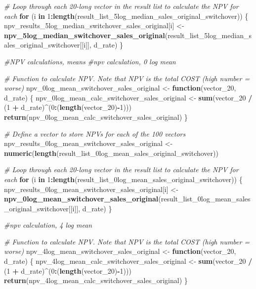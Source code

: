 \documentclass[
]{article}
\newenvironment{Shaded}{\begin{snugshade}}{\end{snugshade}}
\newcommand{\CommentTok}[1]{\textcolor[rgb]{0.56,0.35,0.01}{\textit{#1}}}
\newcommand{\ControlFlowTok}[1]{\textcolor[rgb]{0.13,0.29,0.53}{\textbf{#1}}}
\newcommand{\DecValTok}[1]{\textcolor[rgb]{0.00,0.00,0.81}{#1}}
\newcommand{\FunctionTok}[1]{\textcolor[rgb]{0.13,0.29,0.53}{\textbf{#1}}}
\newcommand{\NormalTok}[1]{#1}
\newcommand{\OtherTok}[1]{\textcolor[rgb]{0.56,0.35,0.01}{#1}}
\newcommand{\SpecialCharTok}[1]{\textcolor[rgb]{0.81,0.36,0.00}{\textbf{#1}}}
\begin{document}
\begin{Shaded}
\begin{Highlighting}[]
\CommentTok{\# Loop through each 20{-}long vector in the result list to calculate the NPV for each}
\ControlFlowTok{for}\NormalTok{ (i }\ControlFlowTok{in} \DecValTok{1}\SpecialCharTok{:}\FunctionTok{length}\NormalTok{(result\_list\_5log\_median\_sales\_original\_switchover)) \{}
\NormalTok{  npv\_results\_5log\_median\_switchover\_sales\_original[i] }\OtherTok{\textless{}{-}} \FunctionTok{npv\_5log\_median\_switchover\_sales\_original}\NormalTok{(result\_list\_5log\_median\_sales\_original\_switchover[[i]], d\_rate)}
\NormalTok{\}}



\CommentTok{\#NPV calculations, means}
\CommentTok{\#npv calculation, 0 log mean}

\CommentTok{\# Function to calculate NPV. Note that NPV is the total COST (high number = worse)}
\NormalTok{npv\_0log\_mean\_switchover\_sales\_original }\OtherTok{\textless{}{-}} \ControlFlowTok{function}\NormalTok{(vector\_20, d\_rate) \{}
\NormalTok{  npv\_0log\_mean\_calc\_switchover\_sales\_original }\OtherTok{\textless{}{-}} \FunctionTok{sum}\NormalTok{(vector\_20 }\SpecialCharTok{/}\NormalTok{ (}\DecValTok{1} \SpecialCharTok{+}\NormalTok{ d\_rate)}\SpecialCharTok{\^{}}\NormalTok{(}\DecValTok{0}\SpecialCharTok{:}\NormalTok{(}\FunctionTok{length}\NormalTok{(vector\_20)}\SpecialCharTok{{-}}\DecValTok{1}\NormalTok{)))}
  \FunctionTok{return}\NormalTok{(npv\_0log\_mean\_calc\_switchover\_sales\_original)}
\NormalTok{\}}

\CommentTok{\# Define a vector to store NPVs for each of the 100 vectors}
\NormalTok{npv\_results\_0log\_mean\_switchover\_sales\_original }\OtherTok{\textless{}{-}} \FunctionTok{numeric}\NormalTok{(}\FunctionTok{length}\NormalTok{(result\_list\_0log\_mean\_sales\_original\_switchover))}

\CommentTok{\# Loop through each 20{-}long vector in the result list to calculate the NPV for each}
\ControlFlowTok{for}\NormalTok{ (i }\ControlFlowTok{in} \DecValTok{1}\SpecialCharTok{:}\FunctionTok{length}\NormalTok{(result\_list\_0log\_mean\_sales\_original\_switchover)) \{}
\NormalTok{  npv\_results\_0log\_mean\_switchover\_sales\_original[i] }\OtherTok{\textless{}{-}} \FunctionTok{npv\_0log\_mean\_switchover\_sales\_original}\NormalTok{(result\_list\_0log\_mean\_sales\_original\_switchover[[i]], d\_rate)}
\NormalTok{\}}



\CommentTok{\#npv calculation, 4 log mean}

\CommentTok{\# Function to calculate NPV. Note that NPV is the total COST (high number = worse)}
\NormalTok{npv\_4log\_mean\_switchover\_sales\_original }\OtherTok{\textless{}{-}} \ControlFlowTok{function}\NormalTok{(vector\_20, d\_rate) \{}
\NormalTok{  npv\_4log\_mean\_calc\_switchover\_sales\_original }\OtherTok{\textless{}{-}} \FunctionTok{sum}\NormalTok{(vector\_20 }\SpecialCharTok{/}\NormalTok{ (}\DecValTok{1} \SpecialCharTok{+}\NormalTok{ d\_rate)}\SpecialCharTok{\^{}}\NormalTok{(}\DecValTok{0}\SpecialCharTok{:}\NormalTok{(}\FunctionTok{length}\NormalTok{(vector\_20)}\SpecialCharTok{{-}}\DecValTok{1}\NormalTok{)))}
  \FunctionTok{return}\NormalTok{(npv\_4log\_mean\_calc\_switchover\_sales\_original)}
\NormalTok{\}}


\end{Highlighting}
\end{Shaded}
\end{document}
